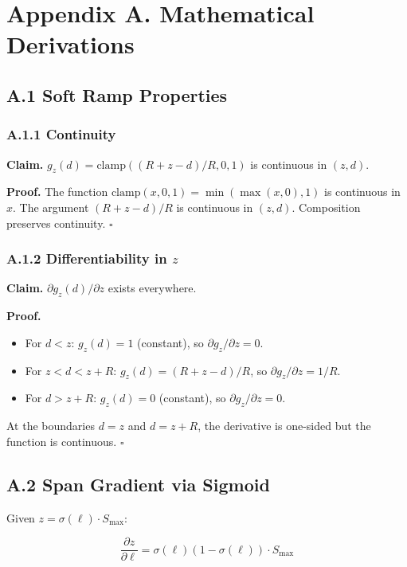 
\section{Appendix A. Mathematical Derivations}

\subsection{A.1 Soft Ramp Properties}

\subsubsection{A.1.1 Continuity}

\textbf{Claim.} $g_z(d) = \text{clamp}((R + z - d) / R, 0, 1)$ is continuous in 
$(z, d)$.

\textbf{Proof.} The function $\text{clamp}(x, 0, 1) = \min(\max(x, 0), 1)$ is 
continuous in $x$. The argument $(R + z - d) / R$ is continuous in $(z, d)$. 
Composition preserves continuity. $\square$

\subsubsection{A.1.2 Differentiability in $z$}

\textbf{Claim.} $\partial g_z(d) / \partial z$ exists everywhere.

\textbf{Proof.} 

\begin{itemize}
\item For $d < z$: $g_z(d) = 1$ (constant), so $\partial g_z / \partial z = 0$.
\item For $z < d < z + R$: $g_z(d) = (R + z - d) / R$, so $\partial g_z / \partial z = 1/R$.
\item For $d > z + R$: $g_z(d) = 0$ (constant), so $\partial g_z / \partial z = 0$.

\end{itemize}
At the boundaries $d = z$ and $d = z + R$, the derivative is one-sided but 
the function is continuous. $\square$

\subsection{A.2 Span Gradient via Sigmoid}

Given $z = \sigma(\ell) \cdot S_\text{max}$:

\[
\frac{\partial z}{\partial \ell} = \sigma(\ell)(1 - \sigma(\ell)) \cdot S_\text{max}
\]


